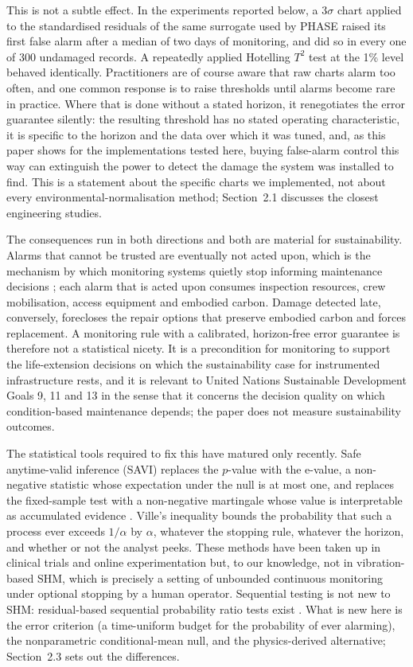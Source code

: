 \documentclass[12pt,a4paper]{article}
\newcommand{\rev}[1]{#1}
\newcommand{\rev}[1]{{\color{revcol}#1}}
\begin{document}
This is not a subtle effect. In the experiments reported below, a $3\sigma$ chart applied to the \rev{standardised residuals of the same surrogate used by PHASE} raised its first false alarm after a median of two days of monitoring, and did so in every one of 300 undamaged records. A repeatedly applied Hotelling $T^2$ test at the 1\% level behaved identically. Practitioners are of course aware that raw charts alarm too often, and \rev{one common response is} to raise thresholds until alarms become rare in practice. \rev{Where that is done without a stated horizon, it renegotiates the error guarantee silently:} the resulting threshold has no stated operating characteristic, it is specific to the horizon and the data over which it was tuned, and, as this paper shows \rev{for the implementations tested here}, buying false-alarm control this way can extinguish the power to detect the damage the system was installed to find. \rev{This is a statement about the specific charts we implemented, not about every environmental-normalisation method; Section~2.1 discusses the closest engineering studies.}

The consequences run in both directions and both are material for sustainability. Alarms that cannot be trusted are eventually not acted upon, which is the mechanism by which monitoring systems quietly stop informing maintenance decisions \citep{cawley2018gap}; each alarm that is acted upon consumes inspection resources, crew mobilisation, access equipment and embodied carbon. Damage detected late, conversely, forecloses the repair options that preserve embodied carbon and forces replacement. A monitoring rule with a calibrated, horizon-free error guarantee is therefore not a statistical nicety. It is a precondition for monitoring to support the life-extension decisions on which the sustainability case for instrumented infrastructure rests, and it is relevant to United Nations Sustainable Development Goals 9, 11 and 13 \rev{in the sense that it concerns the decision quality on which condition-based maintenance depends; the paper does not measure sustainability outcomes}.

The statistical tools required to fix this have matured only recently. Safe anytime-valid inference (SAVI) replaces the $p$-value with the e-value, a non-negative statistic whose expectation under the null is at most one, and replaces the fixed-sample test with a non-negative martingale whose value is interpretable as accumulated evidence \citep{ramdas2023game,grunwald2024safe,vovk2021evalues}. Ville's inequality bounds the probability that such a process ever exceeds $1/\alpha$ by $\alpha$, whatever the stopping rule, whatever the horizon, and whether or not the analyst peeks. These methods have been taken up in clinical trials and online experimentation but, to our knowledge, not in vibration-based SHM, which is precisely a setting of unbounded continuous monitoring under optional stopping by a human operator. \rev{Sequential testing is not new to SHM: residual-based sequential probability ratio tests exist \citep{kopsaftopoulos2015sprt}. What is new here is the error criterion (a time-uniform budget for the probability of ever alarming), the nonparametric conditional-mean null, and the physics-derived alternative; Section~2.3 sets out the differences.}
\end{document}
